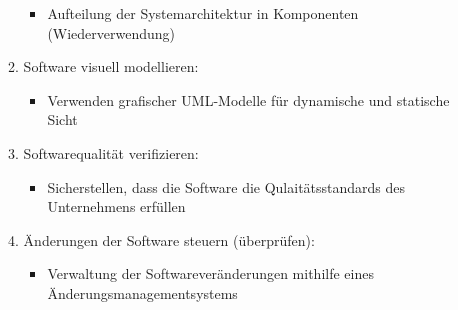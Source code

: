 \begin{itemize}
\begin{enumerate}
\begin{itemize}
            \item Aufteilung der Systemarchitektur in Komponenten (Wiederverwendung)
        \end{itemize}
        \item Software visuell modellieren:
        \begin{itemize}
            \item Verwenden grafischer UML-Modelle für dynamische und statische Sicht 
        \end{itemize}
        \item Softwarequalität verifizieren:
        \begin{itemize}
            \item Sicherstellen, dass die Software die Qulaitätsstandards des Unternehmens erfüllen
        \end{itemize}
        \item Änderungen der Software steuern (überprüfen):
        \begin{itemize}
            \item Verwaltung der Softwareveränderungen mithilfe eines Änderungsmanagementsystems
        \end{itemize}
    \end{enumerate}
\end{itemize}
